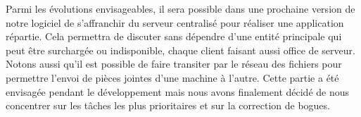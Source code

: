 	Parmi les évolutions envisageables, il sera possible dans une prochaine version de notre logiciel de s'affranchir du serveur centralisé pour réaliser une application répartie. Cela permettra de discuter sans dépendre d'une entité principale qui peut être surchargée ou indisponible, chaque client faisant aussi office de serveur. Notons aussi qu'il est possible de faire transiter par le réseau des fichiers pour permettre l'envoi de pièces jointes d'une machine à l'autre. Cette partie a été envisagée pendant le développement mais nous avons finalement décidé de nous concentrer sur les tâches les plus prioritaires et sur la correction de bogues.
